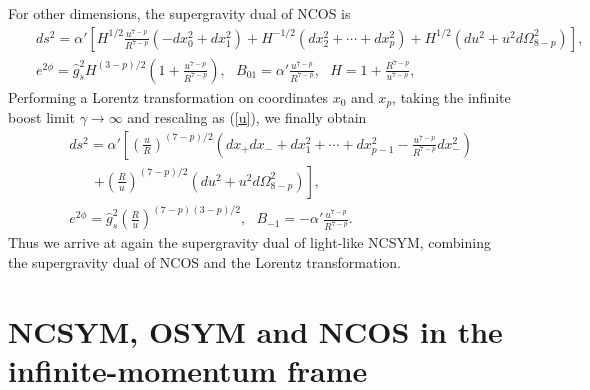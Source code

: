\documentclass[a4paper,12pt]{article}
\newcommand{\sect}[1]{\setcounter{equation}{0}\section{#1}}
\begin{document}
For other dimensions, the supergravity dual of NCOS is \cite{Harm1}
\begin{eqnarray}
&& ds^2= \alpha'\left [ H^{1/2}\frac{u^{7-p}}{R^{7-p}}
 \left (-dx_0^2 +dx_1^2\right) +H^{-1/2} (dx_2^2 +\cdots +dx_p^2 )
 + H^{1/2}(du^2 +u^2d\Omega_{8-p}^2 )\right], \nonumber\\
\label{ncosdual}
&& e^{2\phi} =\hat{g}_s^2 H^{(3-p)/2}\left(1+\frac{u^{7-p}}{R^{7-p}}\right),
 \ \ \ B_{01}=\alpha' \frac{u^{7-p}}{R^{7-p}}, \ \ \
 H = 1+\frac{R^{7-p}}{u^{7-p}},
\end{eqnarray}
Performing a Lorentz transformation on coordinates $x_0$ and $x_p$,
taking the infinite boost limit $\gamma \to \infty$ and rescaling as
(\ref{u}), we finally obtain
\begin{eqnarray}
&& ds^2=\alpha'\left [\left(\frac{u}{R}\right)^{(7-p)/2}\left (
  dx_+dx_- +dx_1^2 +\cdots +dx_{p-1}^2
 -\frac{ u^{7-p}}{R^{7-p}}dx_-^2 \right)
\right. \nonumber \\
&&~~~~~~~~\left. +\left(\frac{R}{u}\right)^{(7-p)/2}
    \left(du^2
 +u^2 d\Omega^2_{8-p}\right)\right], \nonumber\\
&& e^{2\phi} = \hat{g}_s^2 \left(\frac{R}{u}
 \right)^{(7-p)(3-p)/2}, \ \ \ B_{-1}=-\alpha' \frac{u^{7-p}}{R^{7-p}}.
\end{eqnarray}
Thus we arrive at again the supergravity dual of light-like
NCSYM, combining the supergravity dual of NCOS
and the Lorentz transformation.






\sect{NCSYM, OSYM and NCOS in the infinite-momentum frame}
\end{document}
